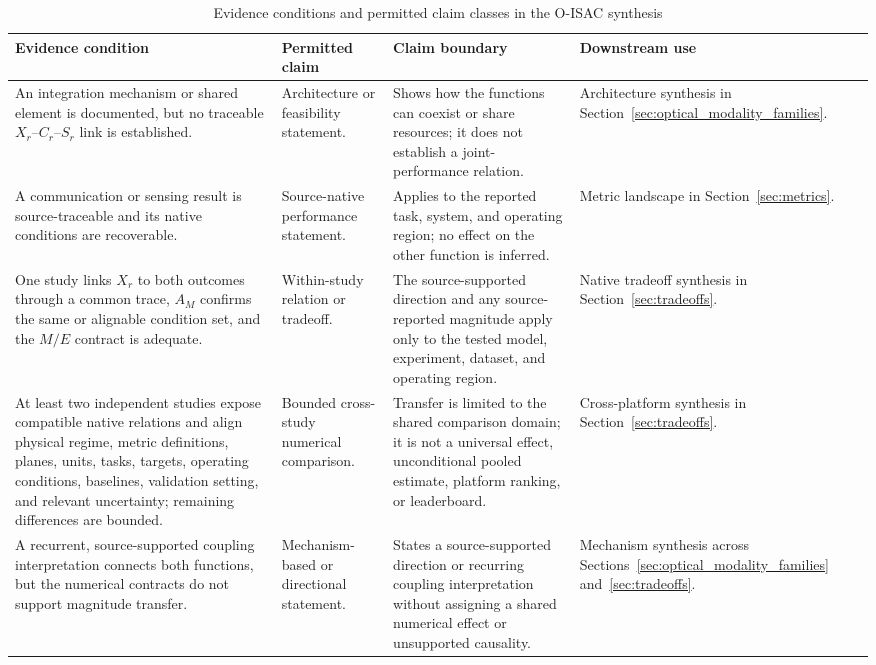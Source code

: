 \begin{table}[!t]
\caption{Evidence conditions and permitted claim classes in the O-ISAC synthesis}
\label{tab:comparison_record}
\centering
\footnotesize
\setlength{\tabcolsep}{3.2pt}
\renewcommand{\arraystretch}{1.12}
\begin{tabularx}{\textwidth}{@{}>{\raggedright\arraybackslash}p{}
>{\raggedright\arraybackslash}p{}
>{\raggedright\arraybackslash}p{}
>{\raggedright\arraybackslash}X@{}}
\toprule
Evidence condition & Permitted claim & Claim boundary & Downstream use \\
\midrule
An integration mechanism or shared element is documented, but no traceable
$X_r$--$C_r$--$S_r$ link is established. &
Architecture or feasibility statement. &
Shows how the functions can coexist or share resources; it does not establish
a joint-performance relation. &
Architecture synthesis in Section~\ref{sec:optical_modality_families}. \\

A communication or sensing result is source-traceable and its native
conditions are recoverable. &
Source-native performance statement. &
Applies to the reported task, system, and operating region; no effect on the
other function is inferred. &
Metric landscape in Section~\ref{sec:metrics}. \\

One study links $X_r$ to both outcomes through a common trace, $A_M$ confirms
the same or alignable condition set, and the $M/E$ contract is adequate. &
Within-study relation or tradeoff. &
The source-supported direction and any source-reported magnitude apply only to
the tested model, experiment, dataset, and operating region. &
Native tradeoff synthesis in Section~\ref{sec:tradeoffs}. \\

At least two independent studies expose compatible native relations and align
physical regime, metric definitions, planes, units, tasks, targets, operating
conditions, baselines, validation setting, and relevant uncertainty; remaining
differences are bounded. &
Bounded cross-study numerical comparison. &
Transfer is limited to the shared comparison domain; it is not a universal
effect, unconditional pooled estimate, platform ranking, or leaderboard. &
Cross-platform synthesis in Section~\ref{sec:tradeoffs}. \\

A recurrent, source-supported coupling interpretation connects both functions,
but the numerical contracts do not support magnitude transfer. &
Mechanism-based or directional statement. &
States a source-supported direction or recurring coupling interpretation
without assigning a shared numerical effect or unsupported causality. &
Mechanism synthesis across Sections~\ref{sec:optical_modality_families}
and~\ref{sec:tradeoffs}. \\


\end{tabularx}
\end{table}
